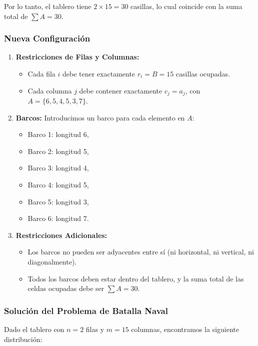 Por lo tanto, el tablero tiene $2 \times 15 = 30$ casillas, lo cual coincide con la suma total de $\sum A = 30$.

\subsubsection*{Nueva Configuración}

\begin{enumerate}
    \item \textbf{Restricciones de Filas y Columnas:}
    \begin{itemize}
        \item Cada fila $i$ debe tener exactamente $r_i = B = 15$ casillas ocupadas.
        \item Cada columna $j$ debe contener exactamente $c_j = a_j$, con $A = \{6, 5, 4, 5, 3, 7\}$.
    \end{itemize}

    \item \textbf{Barcos:}
    Introducimos un barco para cada elemento en $A$:
    \begin{itemize}
        \item Barco 1: longitud 6,
        \item Barco 2: longitud 5,
        \item Barco 3: longitud 4,
        \item Barco 4: longitud 5,
        \item Barco 5: longitud 3,
        \item Barco 6: longitud 7.
    \end{itemize}

    \item \textbf{Restricciones Adicionales:}
    \begin{itemize}
        \item Los barcos no pueden ser adyacentes entre sí (ni horizontal, ni vertical, ni diagonalmente).
        \item Todos los barcos deben estar dentro del tablero, y la suma total de las celdas ocupadas debe ser $\sum A = 30$.
    \end{itemize}
\end{enumerate}

\subsubsection*{Solución del Problema de Batalla Naval}

Dado el tablero con $n = 2$ filas y $m = 15$ columnas, encontramos la siguiente distribución:

